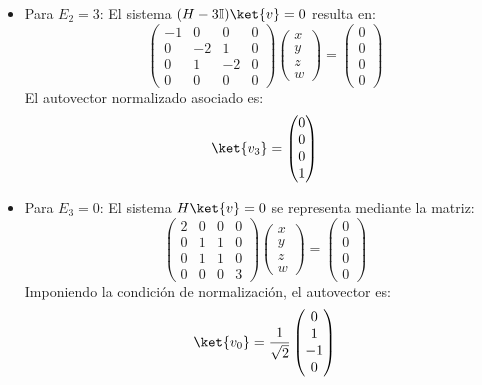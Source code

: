 \documentclass[11pt,a4paper,spanish]{book}
\begin{document}
\begin{itemize}
  \item Para $E_2 = 3$:
  El sistema $(H - 3\mathbb{I})\ket{v} = 0$ resulta en:
  \begin{equation}
  \begin{pmatrix} -1 & 0 & 0 & 0 \\ 0 & -2 & 1 & 0 \\ 0 & 1 & -2 & 0 \\ 0 & 0 & 0 & 0 \end{pmatrix} \begin{pmatrix} x \\ y \\ z \\ w \end{pmatrix} = \begin{pmatrix} 0 \\ 0 \\ 0 \\ 0 \end{pmatrix}
  \end{equation}
  El autovector normalizado asociado es:
  \begin{equation}
  \ket{v_3} = \begin{pmatrix} 0 \\ 0 \\ 0 \\ 1 \end{pmatrix}
  \end{equation}

  \item Para $E_3 = 0$:
  El sistema $H\ket{v} = 0$ se representa mediante la matriz:
  \begin{equation}
  \begin{pmatrix} 2 & 0 & 0 & 0 \\ 0 & 1 & 1 & 0 \\ 0 & 1 & 1 & 0 \\ 0 & 0 & 0 & 3 \end{pmatrix} \begin{pmatrix} x \\ y \\ z \\ w \end{pmatrix} = \begin{pmatrix} 0 \\ 0 \\ 0 \\ 0 \end{pmatrix}
  \end{equation}
  Imponiendo la condición de normalización, el autovector es:
  \begin{equation}
  \ket{v_0} = \frac{1}{\sqrt{2}} \begin{pmatrix} 0 \\ 1 \\ -1 \\ 0 \end{pmatrix}
  \end{equation}
\end{itemize}
\end{document}
